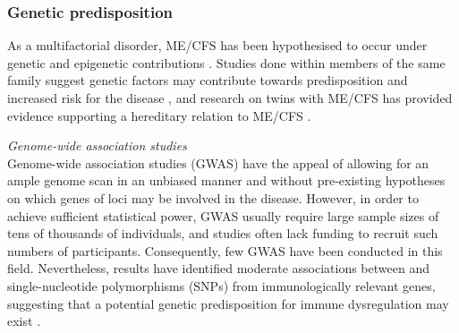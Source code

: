 \subsubsection{Genetic predisposition}

As a multifactorial disorder, ME/CFS has been hypothesised to occur under genetic and epigenetic contributions \citep{wang2017SystematicReview}.
Studies done within members of the same family suggest genetic factors may contribute towards predisposition and increased risk for the disease \citep{walsh2001FamilyHistory, albright2011EvidenceHeritable}, and research on twins with ME/CFS has provided evidence supporting a hereditary relation to ME/CFS \citep{buchwald2001TwinStudy}.

\bsni
\textit{Genome-wide association studies}\\
\noindent
Genome-wide association studies (GWAS) have the appeal of allowing for an ample genome scan in an unbiased manner and without pre-existing hypotheses on which genes of loci may be involved in the disease.
However, in order to achieve sufficient statistical power, GWAS usually require large sample sizes of tens of thousands of individuals, and \cfs studies often lack funding to recruit such numbers of participants.
Consequently, few GWAS have been conducted in this field.
Nevertheless, results have identified moderate associations between \cfs and single-nucleotide polymorphisms (SNPs) from immunologically relevant genes, suggesting that a potential genetic predisposition for immune dysregulation may exist \citep{smithConvergentGenomicStudies2011, schlauch2016GenomewideAssociation}.

